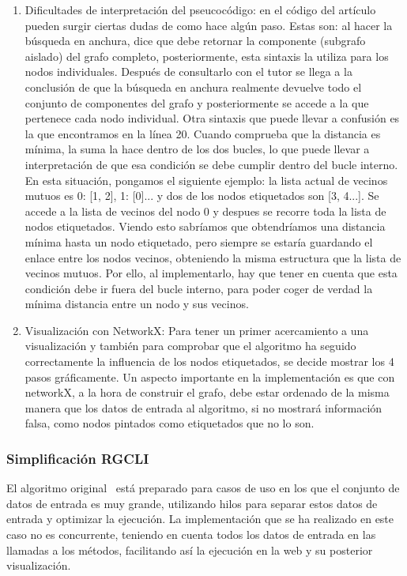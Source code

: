 \begin{enumerate}
	\item Dificultades de interpretación del pseucocódigo: en el código del artículo pueden surgir ciertas dudas de como hace algún paso. Estas son: al hacer la búsqueda en anchura, dice que debe retornar la componente (subgrafo aislado) del grafo completo, posteriormente, esta sintaxis la utiliza para los nodos individuales. Después de consultarlo con el tutor se llega a la conclusión de que la búsqueda en anchura realmente devuelve todo el conjunto de componentes del grafo y posteriormente se accede a la que pertenece cada nodo individual. Otra sintaxis que puede llevar a confusión es la que encontramos en la línea 20. Cuando comprueba que la distancia es mínima, la suma la hace dentro de los dos bucles, lo que puede llevar a interpretación de que esa condición se debe cumplir dentro del bucle interno. En esta situación, pongamos el siguiente ejemplo: la lista actual de vecinos mutuos es {0: [1, 2], 1: [0]...} y dos de los nodos etiquetados son [3, 4...]. Se accede a la lista de vecinos del nodo 0 y despues se recorre toda la lista de nodos etiquetados. Viendo esto sabríamos que obtendríamos una distancia mínima hasta un nodo etiquetado, pero siempre se estaría guardando el enlace entre los nodos vecinos, obteniendo la misma estructura que la lista de vecinos mutuos. Por ello, al implementarlo, hay que tener en cuenta que esta condición debe ir fuera del bucle interno, para poder coger de verdad la mínima distancia entre un nodo y sus vecinos.
	\item Visualización con NetworkX: Para tener un primer acercamiento a una visualización y también para comprobar que el algoritmo ha seguido correctamente la influencia de los nodos etiquetados, se decide mostrar los 4 pasos gráficamente. Un aspecto importante en la implementación es que con networkX, a la hora de construir el grafo, debe estar ordenado de la misma manera que los datos de entrada al algoritmo, si no mostrará información falsa, como nodos pintados como etiquetados que no lo son.
\end{enumerate}
\subsubsection{Simplificación RGCLI}
El algoritmo original~\cite{rgcli} está preparado para casos de uso en los que el conjunto de datos de entrada es muy grande, utilizando hilos para separar estos datos de entrada y optimizar la ejecución. La implementación que se ha realizado en este caso no es concurrente, teniendo en cuenta todos los datos de entrada en las llamadas a los métodos, facilitando así la ejecución en la web y su posterior visualización.

